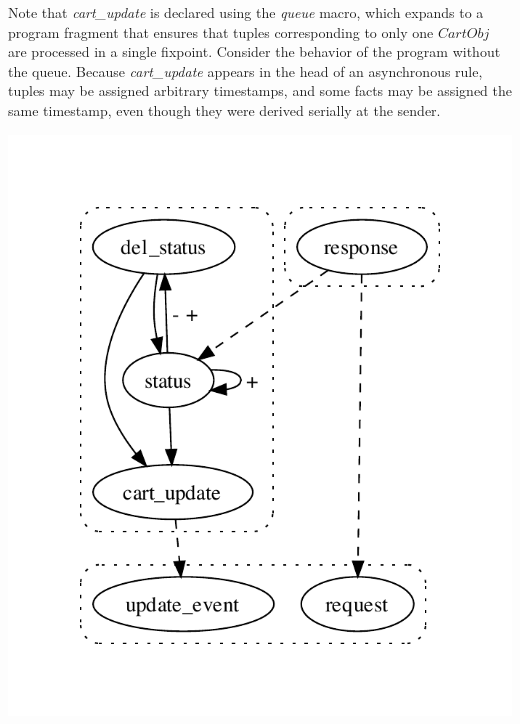 Note that 
{\em cart\_update} is declared using the {\em queue} macro, which expands to
a program fragment that ensures that tuples corresponding to only one $CartObj$
are processed in a single fixpoint. 
Consider the behavior of the program without the queue.  Because {\em
cart\_update} appears in the head of an asynchronous rule,
 tuples may be assigned arbitrary timestamps, and some
 facts may be assigned the same timestamp, even though
they were derived serially at the sender.  





\includegraphics[width=0.65\linewidth]{vizza_straw.pdf}

